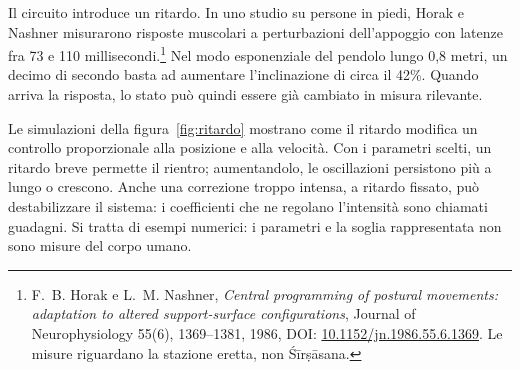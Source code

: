 \documentclass[11pt,a4paper,twoside=false,headinclude,footinclude]{scrartcl}
\begin{document}
Il circuito introduce un ritardo. In uno studio su persone in piedi, Horak e Nashner misurarono risposte muscolari a perturbazioni dell'appoggio con latenze fra 73 e 110 millisecondi.\footnote{F.~B. Horak e L.~M. Nashner, \emph{Central programming of postural movements: adaptation to altered support-surface configurations}, Journal of Neurophysiology 55(6), 1369--1381, 1986, DOI: \href{https://doi.org/10.1152/jn.1986.55.6.1369}{10.1152/jn.1986.55.6.1369}. Le misure riguardano la stazione eretta, non Śīrṣāsana.} Nel modo esponenziale del pendolo lungo 0,8 metri, un decimo di secondo basta ad aumentare l'inclinazione di circa il 42\%. Quando arriva la risposta, lo stato può quindi essere già cambiato in misura rilevante.

Le simulazioni della figura~\ref{fig:ritardo} mostrano come il ritardo modifica un controllo proporzionale alla posizione e alla velocità. Con i parametri scelti, un ritardo breve permette il rientro; aumentandolo, le oscillazioni persistono più a lungo o crescono. Anche una correzione troppo intensa, a ritardo fissato, può destabilizzare il sistema: i coefficienti che ne regolano l'intensità sono chiamati guadagni. Si tratta di esempi numerici: i parametri e la soglia rappresentata non sono misure del corpo umano.
\end{document}
